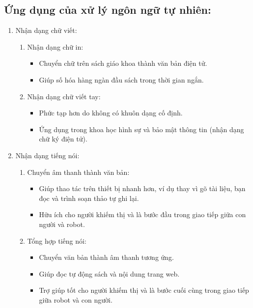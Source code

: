 \subsection{Ứng dụng của xử lý ngôn ngữ tự nhiên:}

    \begin{enumerate}
        \item Nhận dạng chữ viết:
        \begin{enumerate}
            \item Nhận dạng chữ in:
            \begin{itemize}
                \item Chuyển chữ trên sách giáo khoa thành văn bản điện tử.
                \item Giúp số hóa hàng ngàn đầu sách trong thời gian ngắn.
            \end{itemize}
            \item Nhận dạng chữ viết tay:
            \begin{itemize}
                \item Phức tạp hơn do không có khuôn dạng cố định.
                \item Ứng dụng trong khoa học hình sự và bảo mật thông tin (nhận dạng chữ ký điện tử).
            \end{itemize}
        \end{enumerate}
        \item Nhận dạng tiếng nói:
        \begin{enumerate}
            \item Chuyển âm thanh thành văn bản: 
            \begin{itemize}
                \item Giúp thao tác trên thiết bị nhanh hơn, ví dụ thay vì gõ tài liệu, bạn đọc và trình soạn thảo tự ghi lại.
                \item Hữu ích cho người khiếm thị và là bước đầu trong giao tiếp giữa con người và robot.
            \end{itemize}
        \item Tổng hợp tiếng nói:
        \begin{itemize}
            \item Chuyển văn bản thành âm thanh tương ứng.
            \item Giúp đọc tự động sách và nội dung trang web.
            \item Trợ giúp tốt cho người khiếm thị và là bước cuối cùng trong giao tiếp giữa robot và con người.
        \end{itemize}

\end{enumerate}
\end{enumerate}
